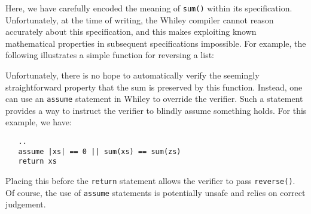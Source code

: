 

Here, we have carefully encoded the meaning of \lstinline{sum()}
within its specification.  Unfortunately, at the time of writing, the
Whiley compiler cannot reason accurately about this specification, and this makes exploiting known mathematical properties in subsequent specifications impossible.  For example, the following illustrates a simple function for reversing a list:



Unfortunately, there is no hope to automatically verify the seemingly straightforward property that the sum is preserved by this function.  Instead, one can use an \lstinline{assume} statement in Whiley to override the verifier.  Such a statement provides a way to instruct the verifier to blindly assume something holds.  For this example, we have:
\begin{lstlisting}
   ..
   assume |xs| == 0 || sum(xs) == sum(zs)
   return xs
\end{lstlisting}

Placing this before the \lstinline{return} statement allows the verifier to pass \lstinline{reverse()}.  Of course, the use of \lstinline{assume} statements is potentially unsafe and relies on correct judgement.  
